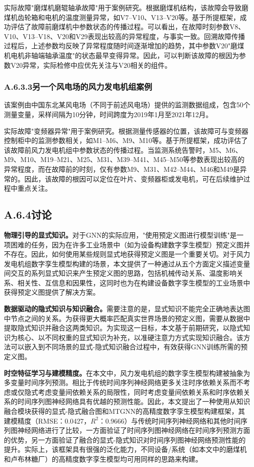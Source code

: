 实际故障"磨煤机磨辊轴承故障"用于案例研究。根据磨煤机结构，该故障会导致磨煤机齿轮箱和电机的温度测量异常，如V7--V10、V13--V20等。基于所提框架，成功评估了故障前磨煤机中参数状态的传播过程。可以看出，在故障时刻参数V8、V10、V13--V18、V20和V29表现出较高的异常程度，与事实一致。回溯故障传播过程后，上述参数均反映了异常程度随时间逐渐增加的趋势，其中参数V20"磨煤机电机非轴端轴承温度"的状态最早变得异常。因此，可以判断该故障的根因为参数V20异常，实际检修中应优先关注与V20相关的组件。

\subsubsection*{A.6.3.3\quad 另一个风电场的风力发电机组案例}

该案例由中国东北某风电场（不同于前述风电场）提供的监测数据组成，包含50个测量变量，采样间隔为10分钟，时间跨度为2019年1月至2021年12月。

实际故障"变频器异常"用于案例研究。根据测量传感器的位置，该故障可与变频器控制柜中的监测参数相关，如M1--M6、M9、M10等。基于所提框架，成功评估了该故障前风力发电机组中参数状态的传播过程。当监测系统告警时，M5、M6、M9、M10、M19--M21、M25、M31、M39--M41、M45--M50等参数表现出较高的异常程度，而在故障前的时刻，仅有参数M9、M31、M42--M44、M46和M49是异常的。因此，该故障的根因可以定位在叶片、变频器柜或发电机，可在后续维护过程中重点关注。

\subsection*{A.6.4\quad 讨论}

\textbf{物理引导的显式知识。}对于GNN的实际应用，"使用预定义图进行模型训练"是一项困难的任务，因为在许多工业场景中（如为设备构建数字孪生模型）预定义图并不存在。因此，如何使用某些规则显式地获得预定义图是一个重要关切。对于风力发电机组数字孪生模型构建的场景，本文提供了一种通过从五个方面定义描述变量间交互的系列显式知识来产生预定义图的思路，包括机械传动关系、温度影响关系、相关性、互信息和因果性，这同时也为在构建设备数字孪生模型的工业场景中获得预定义图提供了解决方案。

\textbf{数据驱动的隐式知识与知识融合。}需要注意的是，显式知识不能完全正确地表达图中节点之间的关系。为获得更大概率匹配真实世界场景的预定义图，需要从数据中提取隐式知识并融合这两类知识。为实现这一目标，本文基于前期研究，以隐式知识为核心、以不同权重的显式知识为补充，以准硬注意力方式实现知识融合。该方法可以嵌入到不同场景的显式-隐式知识融合过程中，有效获得GNN训练所需的预定义图。

\textbf{时空特征学习与建模精度。}在本文中，风力发电机组的数字孪生模型构建被抽象为多变量时间序列预测。相比于传统时间序列神经网络更多关注时序依赖关系而不考虑或仅隐式考虑变量间依赖关系的局限性，同时考虑变量间依赖关系和时序依赖关系的时间序列图神经网络具有优越的预测性能。因此，本文提出了一种使用从知识融合模块获得的显式-隐式融合图和MTGNN的高精度数字孪生模型构建框架，其建模精度（RMSE：0.0427，$R^2$：0.9666）与传统时间序列神经网络和其他时间序列图神经网络进行了比较，一方面验证了时间序列图神经网络在时间序列预测方面的优势，另一方面验证了融合的显式-隐式知识对时间序列图神经网络预测性能的提升。实际上，该框架具有很强的泛化能力，不同设备/系统（如本文中的磨煤机和卢布林糖厂）的高精度数字孪生模型均可用同样的思路来构建。

